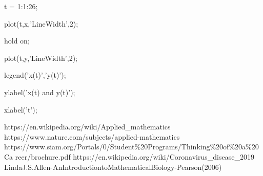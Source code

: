 \documentclass[12pt]{article}
\begin{document}
t = 1:1:26;

plot(t,x,'LineWidth',2);

hold on;

plot(t,y,'LineWidth',2);

legend('x(t)','y(t)');

ylabel('x(t) and y(t)');

xlabel('t');



\begin{thebibliography}{4}
https://en.wikipedia.org/wiki/Applied\_mathematics
https://www.nature.com/subjects/applied-mathematics
https://www.siam.org/Portals/0/Student\%20Programs/Thinking\%20of\%20a\%20Ca
reer/brochure.pdf
https://en.wikipedia.org/wiki/Coronavirus\_disease\_2019
LindaJ.S.Allen-AnIntroductiontoMathematicalBiology-Pearson(2006)
\end{thebibliography}
\end{document}
